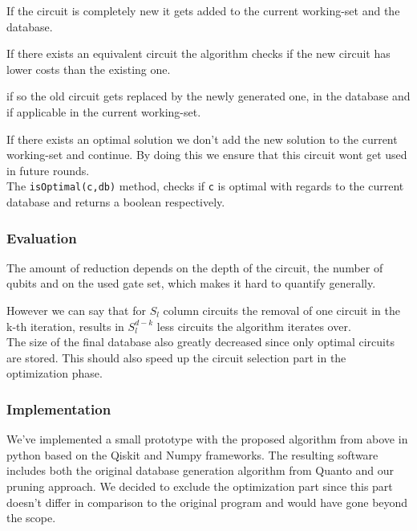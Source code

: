 If the circuit is completely new it gets added to the current working-set and the database. 

If there exists an equivalent circuit the algorithm checks if the new circuit has lower costs than the existing one. 

if so the old circuit gets replaced by the newly generated one, in the database and if applicable in the current working-set. 

If there exists an optimal solution we don't add the new solution to the current working-set and continue. By doing this we ensure that this circuit wont get used in future rounds.\\

The \texttt{isOptimal(c,db)} method, checks if \texttt{c} is optimal with regards to the current database  and returns a boolean respectively.\\



\subsubsection{Evaluation}
The amount of reduction depends on the depth of the circuit, the number of qubits and on the used gate set, which makes it hard to quantify generally. 

However we can say that for $S_l$ column circuits the removal of one circuit in the k-th iteration, results in $S_l^{d-k}$ less circuits the algorithm iterates over.\\

The size of the final database also greatly decreased since only optimal circuits are stored. This should also speed up the circuit selection part in the optimization phase.

\subsubsection{Implementation}
We've implemented a small prototype with the proposed algorithm from above in python based on the Qiskit and Numpy frameworks. 
The resulting software includes both the original database generation algorithm from Quanto and our pruning approach. 
We decided to exclude the optimization part since this part doesn't differ in comparison to the original program and would have gone beyond the scope.\\

